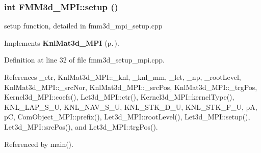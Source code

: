 \subsubsection{\setlength{\rightskip}{0pt plus 5cm}int FMM3d\_\-MPI::setup ()\hspace{0.3cm}{\tt  [virtual]}}\label{classFMM3d__MPI_415266b005d267e801176f27c0434a50_415266b005d267e801176f27c0434a50}


setup function, detailed in fmm3d\_\-mpi\_\-setup.cpp 

Implements {\bf Knl\-Mat3d\_\-MPI} {\rm (p.\,\pageref{classKnlMat3d__MPI_98f7aa1beebfd344710d076d3d6413a2_98f7aa1beebfd344710d076d3d6413a2})}.

Definition at line 32 of file fmm3d\_\-setup\_\-mpi.cpp.

References \_\-ctr, Knl\-Mat3d\_\-MPI::\_\-knl, \_\-knl\_\-mm, \_\-let, \_\-np, \_\-root\-Level, Knl\-Mat3d\_\-MPI::\_\-src\-Nor, Knl\-Mat3d\_\-MPI::\_\-src\-Pos, Knl\-Mat3d\_\-MPI::\_\-trg\-Pos, Kernel3d\_\-MPI::coefs(), Let3d\_\-MPI::ctr(), Kernel3d\_\-MPI::kernel\-Type(), KNL\_\-LAP\_\-S\_\-U, KNL\_\-NAV\_\-S\_\-U, KNL\_\-STK\_\-D\_\-U, KNL\_\-STK\_\-F\_\-U, p\-A, p\-C, Com\-Object\_\-MPI::prefix(), Let3d\_\-MPI::root\-Level(), Let3d\_\-MPI::setup(), Let3d\_\-MPI::src\-Pos(), and Let3d\_\-MPI::trg\-Pos().

Referenced by main().


